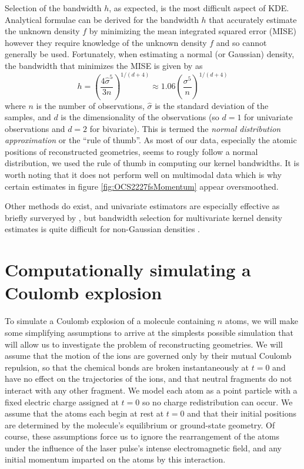 Selection of the bandwidth $h$, as expected, is the most difficult aspect of KDE. Analytical formulae can be derived for the bandwidth $h$ \citep[p. 143]{Scott15} that accurately estimate the unknown density $f$ by minimizing the mean integrated squared error (MISE) however they require knowledge of the unknown density $f$ and so cannot generally be used. Fortunately, when estimating a normal (or Gaussian) density, the bandwidth that minimizes the MISE is given by \citet{Silverman86} as
\begin{equation}
h = \left(\frac{4\hat{\sigma}^5}{3n} \right)^{1/(d+4)}
\approx 1.06 \left(\frac{\sigma^5}{n} \right)^{1/(d+4)}
\end{equation}
where $n$ is the number of observations, $\hat{\sigma}$ is the standard deviation of the samples, and $d$ is the dimensionality of the observations (so $d=1$ for univariate observations and $d=2$ for bivariate). This is termed the \emph{normal distribution approximation} or the ``rule of thumb''. As most of our data, especially the atomic positions of reconstructed geometries, seems to rougly follow a normal distribution, we used the \citet{Silverman86} rule of thumb in computing our kernel bandwidths. It is worth noting that it does not perform well on multimodal data which is why certain estimates in figure \ref{fig:OCS2227fsMomentum} appear oversmoothed.

Other methods do exist, and univariate estimators are especially effective as briefly surveryed by \citet{Jones96}, but bandwidth selection for multivariate kernel density estimates is quite difficult for non-Gaussian densities \citep[\S 6.5.2]{Scott15}.

\section{Computationally simulating a Coulomb explosion} \label{sec:simulating}
To simulate a Coulomb explosion of a molecule containing $n$ atoms, we will make some simplifying assumptions to arrive at the simplests possible simulation that will allow us to investigate the problem of reconstructing geometries. We will assume that the motion of the ions are governed only by their mutual Coulomb repulsion, so that the chemical bonds are broken instantaneously at $t = 0$ and have no effect on the trajectories of the ions, and that neutral fragments do not interact with any other fragment. We model each atom as a point particle with a fixed electric charge assigned at $t = 0$ so no charge redistribution can occur. We assume that the atoms each begin at rest at $t = 0$ and that their initial positions are determined by the molecule's equilibrium or ground-state geometry. Of course, these assumptions force us to ignore the rearrangement of the atoms under the influence of the laser pulse's intense electromagnetic field, and any initial momentum imparted on the atoms by this interaction.

